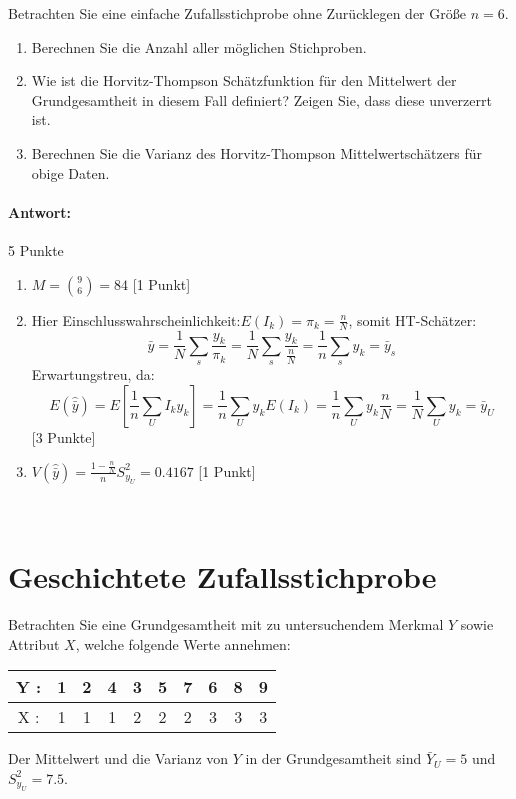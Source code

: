 \documentclass{article}
\begin{document}
Betrachten Sie eine einfache Zufallsstichprobe ohne Zurücklegen der Größe $n=6$.
\begin{enumerate}
		\item Berechnen Sie die Anzahl aller möglichen Stichproben.
		\item Wie ist die Horvitz-Thompson Schätzfunktion für den Mittelwert der Grundgesamtheit in diesem Fall definiert? Zeigen Sie, dass diese unverzerrt ist.
		\item Berechnen Sie die Varianz des Horvitz-Thompson Mittelwertschätzers für obige Daten.
	\end{enumerate}

\paragraph{Antwort:}
\begin{solution} 5 Punkte
\begin{enumerate}
	\item $M=\binom{9}{6}=84$ [1 Punkt]
	\item Hier Einschlusswahrscheinlichkeit:$E(I_k)=\pi_k = \frac{n}{N}$, somit HT-Schätzer: $$\hat{\bar{y}}=\frac{1}{N} \sum_s \frac{y_k}{\pi_k}=\frac{1}{N}\sum_s \frac{y_k}{\frac{n}{N}}= \frac{1}{n}\sum_s y_k = \bar{y}_s$$
	Erwartungstreu, da:
	$$E(\hat{\bar{y}}) = E[\frac{1}{n}\sum_U I_k y_k] = \frac{1}{n}\sum_U y_k E(I_k)=\frac{1}{n}\sum_U y_k \frac{n}{N} = \frac{1}{N}\sum_U y_k=\bar{y}_U$$ [3 Punkte]
	\item $V(\hat{\bar{y}})= \frac{1-\frac{n}{N}}{n} S_{y_U}^2 =0.4167$ [1 Punkt]
\end{enumerate}
\end{solution}
~\newpage



\section{Geschichtete Zufallsstichprobe}
Betrachten Sie eine Grundgesamtheit mit zu untersuchendem Merkmal $Y$ sowie Attribut $X$, welche folgende Werte annehmen:
\begin{center}
	\begin{tabular}{c|c|c|c|c|c|c|c|c|c}	 
		Y : & 1 & 2 & 4 & 3 & 5 & 7 & 6 & 8 & 9 \\ 
		\hline 
		X : & 1 & 1 & 1 & 2 & 2 & 2 & 3 & 3 & 3 
	\end{tabular} 
\end{center}
Der Mittelwert und die Varianz von $Y$ in der Grundgesamtheit sind $\bar{Y}_U=5$ und $S_{y_U}^2=7.5$. 
\end{document}
